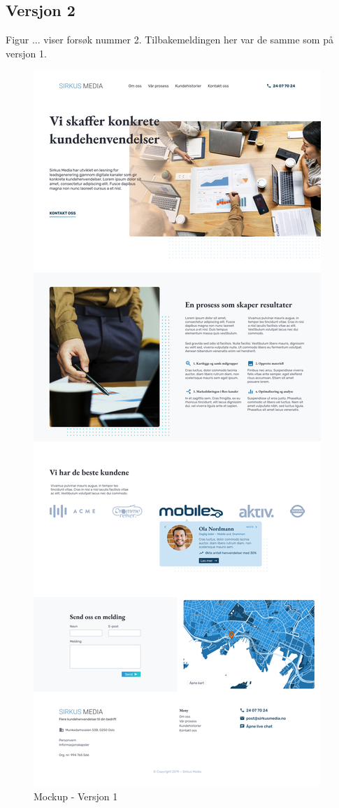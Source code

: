 \subsection{Versjon 2}
Figur ... viser forsøk nummer 2. Tilbakemeldingen her var de samme som på versjon 1.
\begin{figure}[H]
    \centering
    \includegraphics[width=\textwidth]{mockup1-draft3.png}
    \caption{Mockup - Versjon 1}
    \label{fig:mockup-v1}
\end{figure}

